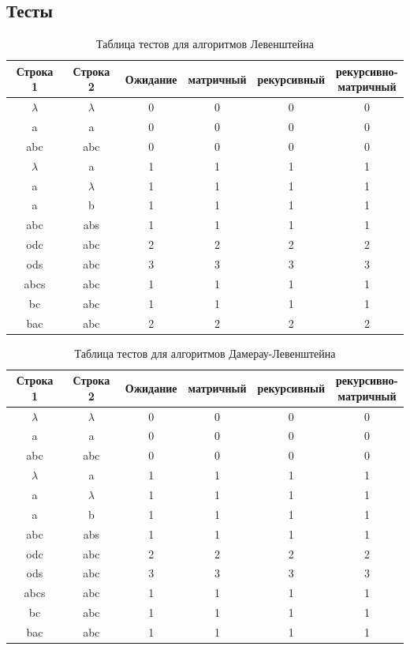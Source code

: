 \documentclass[a4paper,12pt]{article}
\begin{document}
\subsection{Тесты}
\begin{table}[H]
    \centering
    \begin{tabular}{|c|c|c|c|c|c|}
        \hline
        \textbf{Строка 1} & \textbf{Строка 2} & \textbf{Ожидание} & \textbf{матричный} & \textbf{рекурсивный} & \makecell{\textbf{рекурсивно-}\\\textbf{матричный}} \\
        \hline
        $\lambda$ & $\lambda$ & 0 & 0 & 0 & 0 \\
        a  & a  & 0 & 0 & 0 & 0 \\
        abc & abc & 0 & 0 & 0 & 0 \\
        $\lambda$  & a  & 1 & 1 & 1 & 1 \\
        a  & $\lambda$  & 1 & 1 & 1 & 1 \\
        a  & b  & 1 & 1 & 1 & 1 \\
        abc & abs & 1 & 1 & 1 & 1 \\
        odc & abc & 2 & 2 & 2 & 2 \\
        ods & abc & 3 & 3 & 3 & 3 \\
        abcs & abc & 1 & 1 & 1 & 1 \\
        bc & abc & 1 & 1 & 1 & 1 \\
        bac & abc & 2 & 2 & 2 & 2 \\
        \hline
    \end{tabular}
    \caption{Таблица тестов для алгоритмов Левенштейна}
\end{table}
\begin{table}[H]
    \centering
    \begin{tabular}{|c|c|c|c|c|c|}
        \hline
        \textbf{Строка 1} & \textbf{Строка 2} & \textbf{Ожидание} & \textbf{матричный} & \textbf{рекурсивный} & \makecell{\textbf{рекурсивно-}\\\textbf{матричный}} \\
        \hline
        $\lambda$ & $\lambda$ & 0 & 0 & 0 & 0 \\
        a  & a  & 0 & 0 & 0 & 0 \\
        abc & abc & 0 & 0 & 0 & 0 \\
        $\lambda$  & a  & 1 & 1 & 1 & 1 \\
        a  & $\lambda$  & 1 & 1 & 1 & 1 \\
        a  & b  & 1 & 1 & 1 & 1 \\
        abc & abs & 1 & 1 & 1 & 1 \\
        odc & abc & 2 & 2 & 2 & 2 \\
        ods & abc & 3 & 3 & 3 & 3 \\
        abcs & abc & 1 & 1 & 1 & 1 \\
        bc & abc & 1 & 1 & 1 & 1 \\
        bac & abc & 1 & 1 & 1 & 1 \\
        \hline
    \end{tabular}
    \caption{Таблица тестов для алгоритмов Дамерау-Левенштейна}
\end{table}
\end{document}
